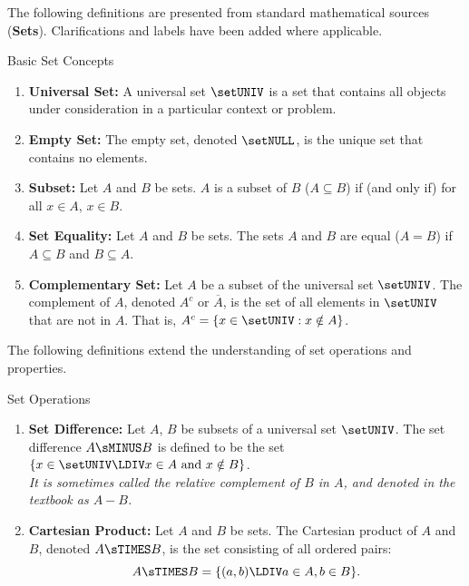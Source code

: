 
The following definitions are presented from standard mathematical sources (\textbf{Sets}).
Clarifications and labels have been added where applicable.

\begin{define}{Basic Set Concepts}
  \label{def:basic-set-concepts}
  \begin{enumerate}
    \item \textbf{Universal Set:} A universal set $\setUNIV$ is a
    set that contains all objects under consideration in a particular context or problem.
    \item \textbf{Empty Set:} The empty set, denoted $\setNULL$,
    is the unique set that contains no elements.
    \item \textbf{Subset:} Let $A$ and $B$ be sets. $A$ is a
    subset of $B$ ($A \subseteq B$) if (and only if)
    for all $x \in A$, $x \in B$.
    \item \textbf{Set Equality:} Let $A$ and $B$ be sets. The sets $A$ and $B$ are
    equal ($A = B$) if $A \subseteq B$ and $B \subseteq A$.
    \item \textbf{Complementary Set:} Let $A$ be a subset of the universal set $\setUNIV$.
    The complement of $A$, denoted $A^c$ or $\overline{A}$, is the set of all elements
    in $\setUNIV$ that are not in $A$. That is, $A^c = \{x \in \setUNIV : x \notin A\}$.
  \end{enumerate}
\end{define}

The following definitions extend the understanding of set operations
and properties.

\begin{define}{Set Operations}
  \label{def:set-operations}
  \begin{enumerate}
    \item \textbf{Set Difference:} Let $A$, $B$ be subsets of a universal set $\setUNIV$.
    The set difference $A \sMINUS B$ is defined to be the set
    $\{ x \in \setUNIV \LDIV x \in A \text{ and } x \notin B\}$. \vspace*{10px}\\
    \textit{It is sometimes called the relative complement of $B$ in $A$,
    and denoted in the textbook as $A - B$.}
    \item \textbf{Cartesian Product:} Let $A$ and $B$ be sets. The Cartesian product of
    $A$ and $B$, denoted $A \sTIMES B$, is the set consisting of all ordered pairs:
    \[
    A \sTIMES B = \{(a, b) \LDIV a \in A, b \in B\}.
    \]
  \end{enumerate}
\end{define}


